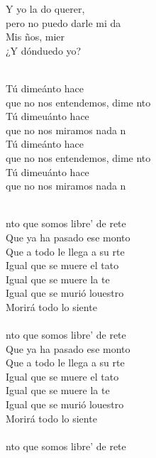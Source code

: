 \begin{cancion}
	Y yo la do querer, \\
	pero no puedo darle mi da\\
	Mis ños, mier\\
	¿Y dónduedo yo?\\\jump\\
	\begin{chorus}%
	Tú dimeánto hace \\
	que no nos entendemos, dime nto \\
	Tú dimeuánto hace  \\
	que no nos miramos nada n\\
	Tú dimeánto hace  \\
	que no nos entendemos, dime nto \\
	Tú dimeuánto hace  \\
	que no nos miramos nada n\\
	\end{chorus}%
	\jump\\
	nto que somos libre' de rete\\
	Que ya ha pasado ese monto\\
	Que a todo le llega a su rte\\
	Igual que se muere el tato\\
	Igual que se muere la te\\
	Igual que se murió louestro\\
	Morirá todo lo siente\\
\jump\\
	nto que somos libre' de rete\\
	Que ya ha pasado ese monto\\
	Que a todo le llega a su rte\\
	Igual que se muere el tato\\
	Igual que se muere la te\\
	Igual que se murió louestro\\
	Morirá todo lo siente\\
\jump\\
	nto que somos libre' de rete\\

\end{cancion}
